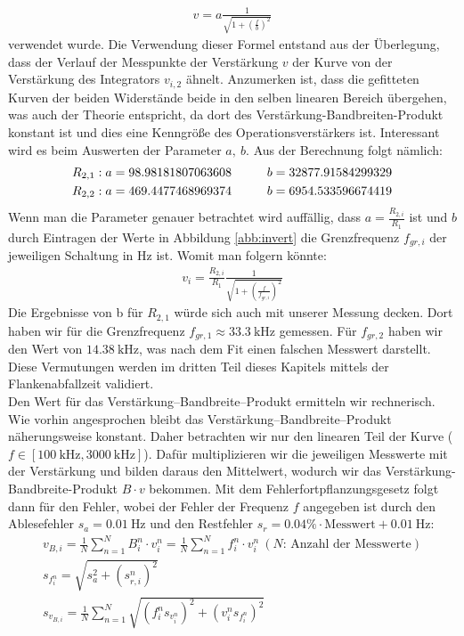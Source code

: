 \begin{gather}
    v = a \frac{1}{\sqrt{1+\left(\frac{f}{b}\right)^2}}
\end{gather}
verwendet wurde. Die Verwendung dieser Formel entstand aus der Überlegung, dass der Verlauf der Messpunkte der Verstärkung $v$ der Kurve von der Verstärkung des Integrators $v_{i,2}$ ähnelt. Anzumerken ist, dass die gefitteten Kurven der beiden Widerstände beide in den selben linearen Bereich übergehen, was auch der Theorie entspricht, da dort des Verstärkung-Bandbreiten-Produkt konstant ist und dies eine Kenngröße des Operationsverstärkers ist. Interessant wird es beim Auswerten der Parameter $a,~b$. Aus der Berechnung folgt nämlich:
\begin{gather}
    R_{2,1}: a = 98.98181807063608 \tab b = 32877.91584299329 \\
    R_{2,2}: a = 469.4477468969374 \tab b = 6954.533596674419
\end{gather}
Wenn man die Parameter genauer betrachtet wird auffällig, dass $a=\frac{R_{2,i}}{R_1}$ ist und $b$ durch Eintragen der Werte in Abbildung \ref{abb:invert} die Grenzfrequenz $f_{gr,i}$ der jeweiligen Schaltung in Hz ist. Womit man folgern könnte:
\begin{gather}
    v_i = \frac{R_{2,i}}{R_1} \frac{1}{\sqrt{1+\left(\frac{f}{f_{gr,i}}\right)^2}}
\end{gather}
Die Ergebnisse von b für $R_{2,1}$ würde sich auch mit unserer Messung decken. Dort haben wir für die Grenzfrequenz $f_{gr,1}\approx33.3~\text{kHz}$ gemessen. Für $f_{gr,2}$ haben wir den Wert von $14.38~\text{kHz}$, was nach dem Fit einen falschen Messwert darstellt. Diese Vermutungen werden im dritten Teil dieses Kapitels mittels der Flankenabfallzeit validiert.\\
\newline
Den Wert für das Verstärkung–Bandbreite–Produkt ermitteln wir rechnerisch. Wie vorhin angesprochen bleibt das Verstärkung–Bandbreite–Produkt näherungsweise konstant. Daher betrachten wir nur den linearen Teil der Kurve ($f\in[100~\text{kHz},3000~\text{kHz}]$). Dafür multiplizieren wir die jeweiligen Messwerte mit der Verstärkung und bilden daraus den Mittelwert, wodurch wir das Verstärkung-Bandbreite-Produkt $B\cdot v$ bekommen. Mit dem Fehlerfortpflanzungsgesetz folgt dann für den Fehler, wobei der Fehler der Frequenz $f$ angegeben ist durch den Ablesefehler $s_a=0.01~\text{Hz}$ und den Restfehler $s_r=0.04\%\cdot\text{Messwert}+0.01~\text{Hz}$:
\begin{gather}
    v_{B,i} = \frac{1}{N}\sum_{n=1}^N B_i^n\cdot v_i^n=\frac{1}{N}\sum_{n=1}^N f_i^n\cdot v_i^n~(N\text{: Anzahl der Messwerte})\\
    s_{f_i^n} = \sqrt{s_a^2+(s_{r,i}^n)^2}\\
    s_{v_{B,i}} = \frac{1}{N}\sum_{n=1}^N \sqrt{(f_i^ns_{v_i^n})^2+(v_i^ns_{f_i^n})^2}
\end{gather}
